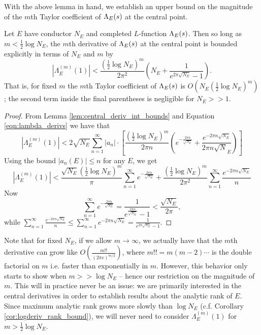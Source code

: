 With the above lemma in hand, we establish an upper bound on the magnitude of the $m$th Taylor coefficient of $\Lambda_E(s)$ at the central point.
\begin{proposition}\label{prop:central_deriv_bounds}
Let $E$ have conductor $N_E$ and completed $L$-function $\Lambda_E(s)$. Then so long as $m<\frac{1}{2}\log N_E$, the $m$th derivative of $\Lambda_E(s)$ at the central point is bounded explicitly in terms of $N_E$ and $m$ by
\begin{equation}
\left| \Lambda_E^{(m)}(1)\right| < \frac{(\frac{1}{2}\log N_E)^m}{2\pi^2}\left(N_E + \frac{1}{e^{2\pi\sqrt{N_E}}-1} \right).
\end{equation}
That is, for fixed $m$ the $m$th Taylor coefficient of $\Lambda_E(s)$ is $O\left( N_E(\frac{1}{2}\log N_E)^m\right)$; the second term inside the final parentheses is negligible for $N_E>>1$.
\end{proposition}

\begin{proof}
From Lemma \ref{lem:central_deriv_int_bounds} and Equation \ref{eqn:lambda_derivs} we have that
\begin{equation*}
\left| \Lambda_E^{(m)}(1)\right| < 2 \sqrt{N_E} \sum_{n=1}^{\infty} |a_n| \cdot \left[\frac{\left(\frac{1}{2} \log N_E\right)^{m}}{2\pi n}\left( e^{-\frac{2\pi n}{\sqrt{N_E}}} + \frac{e^{-2\pi n\sqrt{N_E}}}{2\pi n \sqrt N_E} \right)\right]
\end{equation*}
Using the bound $|a_n(E)| \le n$ for any $E$, we get
\begin{equation*}
\left| \Lambda_E^{(m)}(1)\right| < \frac{ \sqrt{N_E}\left(\frac{1}{2} \log N_E\right)^{m}}{\pi} \sum_{n=1}^{\infty} e^{-\frac{2\pi n}{\sqrt{N_E}}} + \frac{\left(\frac{1}{2} \log N_E\right)^{m}}{2\pi^2} \sum_{n=1}^{\infty} \frac{e^{-2\pi n\sqrt{N_E}}}{n}
\end{equation*}
Now
\begin{equation*}
\sum_{n=1}^{\infty} e^{-\frac{2\pi n}{\sqrt{N_E}}} = \frac{1}{e^{\frac{2\pi n}{\sqrt{N_E}}}-1}< \frac{\sqrt{N_E}}{2\pi},
\end{equation*}
while $\sum_{n=1}^{\infty} \frac{e^{-2\pi n\sqrt{N_E}}}{n} \le \sum_{n=1}^{\infty} e^{-2\pi n\sqrt{N_E}} = \frac{1}{e^{2\pi\sqrt{N_E}}-1}$.
\end{proof}

Note that for fixed $N_E$, if we allow $m \to \infty$, we actually have that the $m$th derivative can grow like $O\left(\frac{m!!}{(2\pi e)^{m/2}}\right)$, where $m!! = m(m-2)\cdots$ is the double factorial on $m$ i.e. faster than exponentially in $m$. However, this behavior only starts to show when $m>>\log N_E$ -- hence our restriction on the magnitude of $m$. This will in practice never be an issue: we are primarily interested in the central derivatives in order to establish results about the analytic rank of $E$. Since maximum analytic rank grows more slowly than $\log N_E$ (c.f. Corollary \ref{cor:logderiv_rank_bound}), we will never need to consider $\Lambda_E^{(m)}(1)$ for $m> \frac{1}{2}\log N_E$. \\


